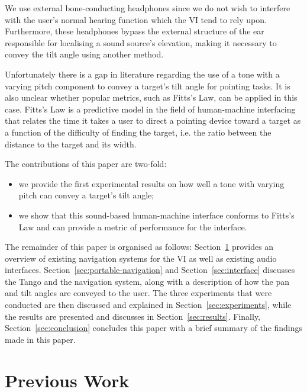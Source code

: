 \documentclass[format=sigconf, review=true, screen=true, anonymous=true]{acmart}
\begin{document}
We use external bone-conducting headphones since we do not wish to interfere with the user's normal hearing function which the VI tend to rely upon. Furthermore, these headphones bypass the external structure of the ear responsible for localising a sound source's elevation, making it necessary to convey the tilt angle using another method. 

Unfortunately there is a gap in literature regarding the use of a tone with a varying pitch component to convey a target's tilt angle for pointing tasks. It is also unclear whether popular metrics, such as Fitts's Law, can be applied in this case. Fitts's Law is a predictive model in the field of human-machine interfacing that relates the time it takes a user to direct a pointing device toward a target as a function of the difficulty of finding the target, i.e. the ratio between the distance to the target and its width. 

The contributions of this paper are two-fold: 

\begin{itemize}
  \item we provide the first experimental results on how well a tone with varying pitch can convey a target's tilt angle; 
  \item we show that this sound-based human-machine interface conforms to Fitts's Law and can provide a metric of performance for the interface.
\end{itemize}

The remainder of this paper is organised as follows: Section~\ref{sec:lit-review} provides an overview of existing navigation systems for the VI as well as existing audio interfaces. Section~\ref{sec:portable-navigation} and Section~\ref{sec:interface} discusses the Tango and the navigation system, along with a description of how the pan and tilt angles are conveyed to the user. The three experiments that were conducted are then discussed and explained in Section~\ref{sec:experiments}, while the results are presented and discusses in Section~\ref{sec:results}. Finally, Section~\ref{sec:conclusion} concludes this paper with a brief summary of the findings made in this paper. 

\section{Previous Work}
\label{sec:lit-review}

\end{document}
